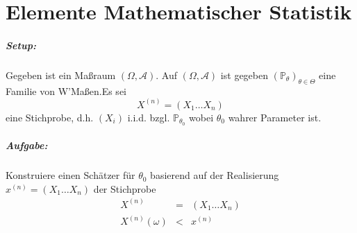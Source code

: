 \documentclass[10pt,a4paper]{report}
\numberwithin{equation}{section}
\numberwithin{figure}{section}
\theoremstyle{plain}
\theoremstyle{definition}
\theoremstyle{remark}
\theoremstyle{plain}
\newcommand{\1}{ \mathbb{1} } %
\begin{document}


\chapter{Elemente Mathematischer Statistik}


\paragraph*{\protect{}Setup: }

Gegeben ist ein Maßraum $\left(\Omega,\mathcal{A}\right)$. Auf $\left(\Omega,\mathcal{A}\right)$
ist gegeben $\left(\mathbb{P}_{\theta}\right)_{\theta\in\Theta}$
eine Familie von W'Maßen.Es sei 
\[
X^{\left(n\right)}=\left(X_{1}\ldots X_{n}\right)
\]
eine Stichprobe, d.h. $\left(X_{i}\right)$ i.i.d.
bzgl. $\mathbb{P}_{\theta_{0}}$ wobei $\theta_{0}$ 
wahrer Parameter ist.


\paragraph*{Aufgabe:}

Konstruiere einen Schätzer für $\theta_{0}$ basierend auf der Realisierung
$x^{\left(n\right)}=\left(X_{1}\ldots X_{n}\right)$ der Stichprobe
\begin{eqnarray*}
X^{\left(n\right)} & = & \left(X_{1}\ldots X_{n}\right)\\
X^{\left(n\right)}\left(\omega\right) & < & x^{\left(n\right)}
\end{eqnarray*}
\end{document}
